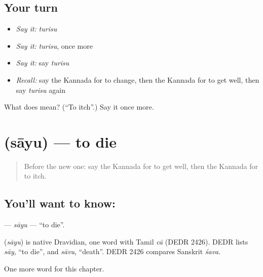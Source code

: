 \subsection*{Your turn}
\begin{itemize}
\raggedright
  \item \emph{Say it:} \emph{turisu}
  \item \emph{Say it:} \emph{turisu}, once more
  \item \emph{Say it:} say \emph{turisu}
  \item \emph{Recall:} say the Kannada for to change, then the Kannada for to get well, then say \emph{turisu} again
\end{itemize}

\begin{tcolorbox}[breakable,colback=teal!4,colframe=teal!35!black,title={Before you move on}]
What does  mean? (\textquotedblleft{}To itch\textquotedblright{}.) Say it once more.
\end{tcolorbox}
\section[\texorpdfstring{\kn{ಸಾಯು} (sāyu)}{ಸಾಯು (sāyu)}]{ (sāyu) — to die}

\label{lesson:KA-C200-sayu}



\begin{quote}
Before the new one: say the Kannada for to get well, then the Kannada for to itch.
\end{quote}

\subsection*{You'll want to know: }
\textbf{} — \emph{sāyu} — \textquotedblleft{}to die\textquotedblright{}.

\begin{cousinweb}
\textbf{} (\emph{sāyu}) is native Dravidian, one word with Tamil \emph{cā} (DEDR 2426). DEDR lists \emph{sāy}, \textquotedblleft{}to die\textquotedblright{}, and \emph{sāvu}, \textquotedblleft{}death\textquotedblright{}. DEDR 2426 compares Sanskrit \emph{śava}.
\end{cousinweb}

\begin{grammarlens}[title={What you've built}]
One more word for this chapter.
\end{grammarlens}

